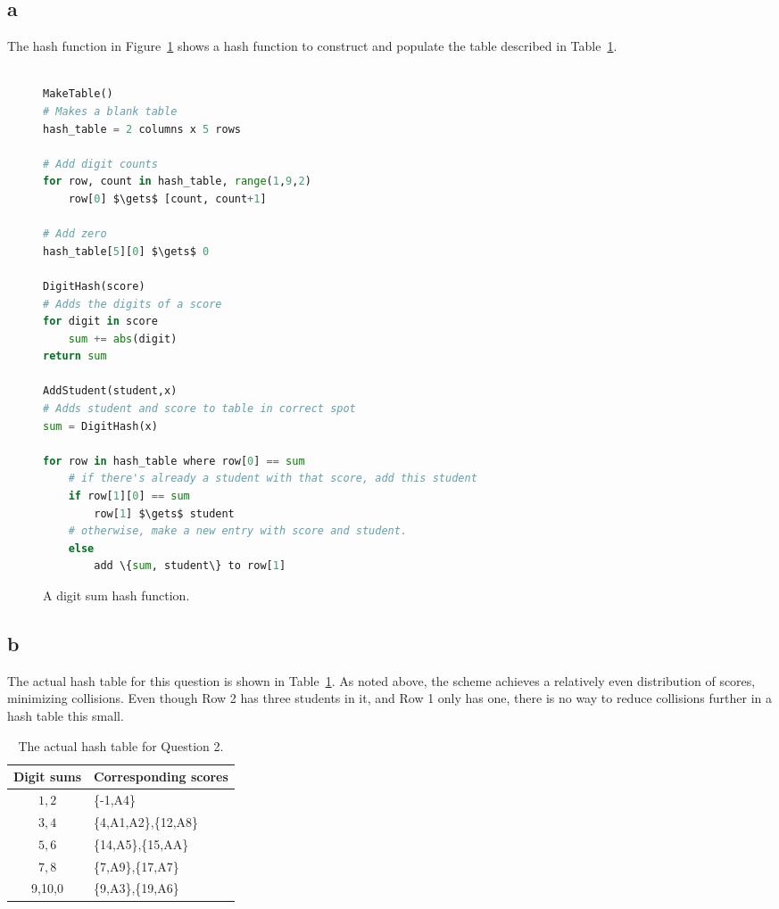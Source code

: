 \documentclass[12pt]{article}
\begin{document}
\subsection*{a} The hash function in Figure~\ref{digithash} shows a hash function to construct and populate the table described in Table~\ref{hashintro}.
\begin{figure}
\begin{framed}
\begin{lstlisting}[language=python, mathescape=true]

MakeTable()
# Makes a blank table
hash_table = 2 columns x 5 rows

# Add digit counts
for row, count in hash_table, range(1,9,2)
	row[0] $\gets$ [count, count+1]

# Add zero
hash_table[5][0] $\gets$ 0

DigitHash(score)
# Adds the digits of a score
for digit in score
	sum += abs(digit)	
return sum

AddStudent(student,x)
# Adds student and score to table in correct spot
sum = DigitHash(x)

for row in hash_table where row[0] == sum
	# if there's already a student with that score, add this student
	if row[1][0] == sum
		row[1] $\gets$ student
	# otherwise, make a new entry with score and student.
	else
		add \{sum, student\} to row[1]

\end{lstlisting}
\end{framed}
\caption{A digit sum hash function.}
\label{digithash}
\end{figure}

\subsection*{b} 
The actual hash table for this question is shown in Table~\ref{hashintro}.  As noted above, the scheme achieves a relatively even distribution of scores, minimizing collisions.  Even though Row 2 has three students in it, and Row 1 only has one, there is no way to reduce collisions further in a hash table this small.
\begin{table}[h]
\centering
\begin{tabular}{c|l}
Digit sums & Corresponding scores\\\hline
$1, 2$ & \{-1,A4\}\\
$3,4$ & \{4,A1,A2\},\{12,A8\}\\
$5,6$ & \{14,A5\},\{15,AA\}\\
$7,8$ & \{7,A9\},\{17,A7\}\\
9,10,0 & \{9,A3\},\{19,A6\}\\
\end{tabular}
\caption{The actual hash table for Question 2.}
\label{hashintro}
\end{table}
\end{document}
